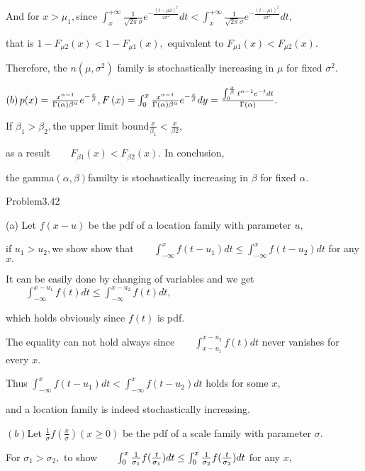 \documentclass{article}
\begin{document}
And for $x>\mu _{1},$since $\int_{x}^{+\infty }\frac{1}{\sqrt{2\pi }\sigma }%
e^{-\frac{\left( t-\mu 2\right) ^{2}}{2\sigma ^{2}}}dt<\int_{x}^{+\infty }%
\frac{1}{\sqrt{2\pi }\sigma }e^{-\frac{\left( t-\mu 1\right) ^{2}}{2\sigma
^{2}}}dt,$

that is $1-F_{\mu 2}\left( x\right) <1-F_{\mu 1}\left( x\right) ,$
equivalent to $F_{\mu 1}(x)<F_{\mu 2}\left( x\right) .$

Therefore, the $n\left( \mu ,\sigma ^{2}\right) $ family is stochastically
increasing in $\mu $ for fixed $\sigma ^{2}.$

$\left( b\right) p(x)=\frac{x^{\alpha -1}}{\Gamma \left( \alpha \right)
\beta ^{\alpha }}e^{-\frac{x}{\beta }},F\left( x\right) =\int_{0}^{x}\frac{%
x^{\alpha -1}}{\Gamma \left( \alpha \right) \beta ^{\alpha }}e^{-\frac{x}{%
\beta }}dy=\frac{\int_{0}^{\frac{x}{\beta }}t^{\alpha -1}e^{-t}dt}{\Gamma
\left( \alpha \right) }.$

If $\beta _{1}>\beta _{2},$the upper limit bound$\frac{x}{\beta _{1}}<\frac{x%
}{\beta 2},$

as a result$\qquad F_{\beta 1}\left( x\right) <F_{\beta 2}\left( x\right) .$%
In conclusion,

the gamma$\left( \alpha ,\beta \right) $familty is stochastically increasing
in $\beta $ for fixed $\alpha .$

Problem3.42

\bigskip (a) Let $f\left( x-u\right) $ be the pdf of a location family with
parameter $u,$

if $u_{1}>u_{2},$we show show that$\qquad \int_{-\infty
}^{x}f(t-u_{1})dt\leq \int_{-\infty }^{x}f(t-u_{2})dt$ for any $x.$

It can be easily done by changing of variables and we get$\qquad
\int_{-\infty }^{x-u_{1}}f(t)dt\leq \int_{-\infty }^{x-u_{2}}f(t)dt,$

which holds obviously since $f\left( t\right) $ is pdf.

The equality can not hold always since$\qquad \int_{x-u_{1}}^{x-u_{2}}f(t)dt$
never vanishes for every $x.$

Thus $\int_{-\infty }^{x}f(t-u_{1})dt<\int_{-\infty }^{x}f(t-u_{2})dt$ holds
for some $x,$

and a location family is indeed stochastically increasing.

$\left( b\right) $Let $\frac{1}{\sigma }f\left( \frac{x}{\sigma }\right)
\left( x\geq 0\right) $ be the pdf of a scale family with parameter $\sigma
. $

For $\sigma _{1}>\sigma _{2},$ to show$\qquad \int_{0}^{x}\frac{1}{\sigma
_{1}}f(\frac{t}{\sigma _{1}})dt\leq \int_{0}^{x}\frac{1}{\sigma _{2}}f(\frac{%
t}{\sigma _{2}})dt$ for any $x,$
\end{document}
